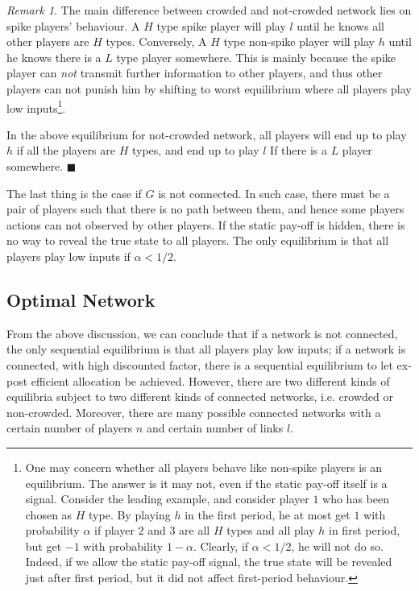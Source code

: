 \documentclass[12pt,letter]{article}
\theoremstyle{remark}
\theoremstyle{remark}
\newtheorem*{remark}{Remark}
\theoremstyle{claim}
\begin{document}
\begin{remark}
The main difference between crowded and not-crowded network lies on spike players' behaviour. A $H$ type spike player will play $l$ until he knows all other players are $H$ types. Conversely, A $H$ type non-spike player will play $h$ until he knows there is a $L$ type player somewhere. This is mainly because the spike player can \textit{not} transmit further information to other players, and thus other players can not punish him by shifting to worst equilibrium where all players play low inputs\footnote{One may concern whether all players behave like non-spike players is an equilibrium. The answer is it may not, even if the static pay-off itself is a signal. Consider the leading example, and consider player $1$ who has been chosen as $H$ type. By playing $h$ in the first period, he at most get $1$ with probability $\alpha$ if player $2$ and $3$ are all $H$ types and all play $h$ in first period, but get $-1$ with probability $1-\alpha$. Clearly, if $\alpha<1/2$, he will not do so. Indeed, if we allow the static pay-off signal, the true state will be revealed just after first period, but it did not affect first-period behaviour.}. 

In the above equilibrium for not-crowded network, all players will end up to play $h$ if all the players are $H$ types, and end up to play $l$ If there is a $L$ player somewhere. $\blacksquare$
\end{remark}


The last thing is the case if $G$ is not connected. In such case, there must be a pair of players such that there is no path between them, and hence some players actions can not observed by other players. If the static pay-off is hidden, there is no way to reveal the true state to all players. The only equilibrium is that all players play low inputs if $\alpha<1/2$.




\subsection{Optimal Network}
\label{sec:optimal}
From the above discussion, we can conclude that if a network is not connected, the only sequential equilibrium is that all players play low inputs; if a network is connected, with high discounted factor, there is a sequential equilibrium to let ex-post efficient allocation be achieved. However, there are two different kinds of equilibria subject to two different kinds of connected networks, i.e. crowded or non-crowded. Moreover, there are many possible connected networks with a certain number of players $n$ and certain number of links $l$. 
\end{document}
